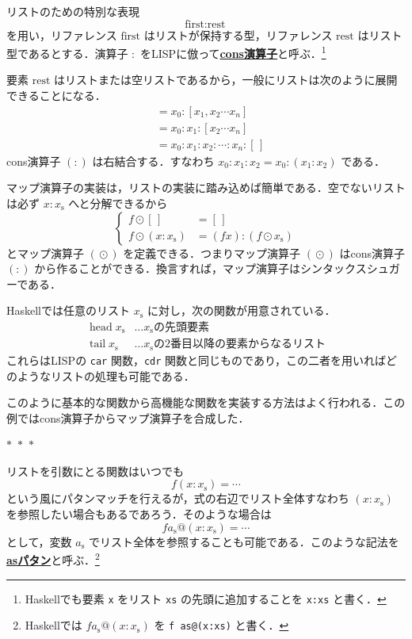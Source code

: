 \documentclass[a5paper,twoside,fleqn,draft]{jsbook}
\newcommand{\separator}{\begin{center}$*$~$*$~$*$\end{center}}
\newcommand{\programminglanguage}[1]{\textsf{#1}}
\newcommand{\haskell}{\programminglanguage{Haskell}}
\newcommand{\lisp}{\programminglanguage{LISP}}
\newcommand{\keyword}[1]{{\underline{\textbf{#1}}}}
\newcommand{\code}[1]{\texttt{#1}}
\newcommand{\mEmptyList}{{[\,]}}
\newcommand{\mSpecialVar}[1]{\textrm{#1}}
\newcommand{\mFirstVar}{\mSpecialVar{first}}
\newcommand{\mRestVar}{\mSpecialVar{rest}}
\newcommand{\mSpecialFunc}[1]{\mathrm{#1}}
\DeclareMathOperator{\mHead}{\mSpecialFunc{head}}
\DeclareMathOperator{\mTail}{\mSpecialFunc{tail}}
\DeclareMathOperator{\mMapList}{\odot}
\newcommand{\mList}[1]{{#1}_\mathrm{s}}
\begin{document}
リストのための特別な表現
\begin{equation}
  \mFirstVar:\mRestVar
\end{equation}
を用い，リファレンス $\mFirstVar$ はリストが保持する型，リファレンス $\mRestVar$ はリスト型であるとする．演算子 $:$ を\lisp に倣って\keyword{cons演算子}と呼ぶ．\footnote{\haskell でも要素 \code{x} をリスト \code{xs} の先頭に追加することを \code{x:xs} と書く．}

要素 $\mRestVar$ はリストまたは空リストであるから，一般にリストは次のように展開できることになる．
\begin{align}
  [x_0,x_1,x_2\dotsb x_n]
  &=x_0:[x_1,x_2\dotsb x_n]\\
  &=x_0:x_1:[x_2\dotsb x_n]\\
  &=x_0:x_1:x_2:\dotsb:x_n:\mEmptyList
\end{align}
cons演算子 $(:)$ は右結合する．すなわち $x_0:x_1:x_2=x_0:(x_1:x_2)$ である．

マップ演算子の実装は，リストの実装に踏み込めば簡単である．空でないリストは必ず $x:\mList{x}$ へと分解できるから
\begin{equation}
  \left\{
  \begin{aligned}
    f\mMapList\mEmptyList
    &=\mEmptyList\\
    f\mMapList{}(x:\mList{x})
    &=(fx):(f\mMapList\mList{x})
  \end{aligned}
  \right.
\end{equation}
とマップ演算子 $(\mMapList)$ を定義できる．つまりマップ演算子 $(\mMapList)$ はcons演算子 $(:)$ から作ることができる．換言すれば，マップ演算子はシンタックスシュガーである．

\haskell では任意のリスト $\mList{x}$ に対し，次の関数が用意されている．
\begin{align*}
  \mHead\mList{x}
  &\dots\text{$\mList{x}$の先頭要素}\\
  \mTail\mList{x}
  &\dots\text{$\mList{x}$の2番目以降の要素からなるリスト}
\end{align*}
これらは\lisp の \code{car} 関数，\code{cdr} 関数と同じものであり，この二者を用いればどのようなリストの処理も可能である．

このように基本的な関数から高機能な関数を実装する方法はよく行われる．この例ではcons演算子からマップ演算子を合成した．

\separator

リストを引数にとる関数はいつでも
\begin{equation}
  f(x:\mList{x})
  =\dotsb
\end{equation}
という風にパタンマッチを行えるが，式の右辺でリスト全体すなわち $(x:\mList{x})$ を参照したい場合もあるであろう．そのような場合は
\begin{equation}
  f\mList{a}@(x:\mList{x})
  =\dotsb
\end{equation}
として，変数 $\mList{a}$ でリスト全体を参照することも可能である．このような記法を\keyword{asパタン}と呼ぶ．\footnote{\haskell では $f\mList{a}@(x:\mList{x})$ を \code{f as@(x:xs)} と書く．}
\end{document}
